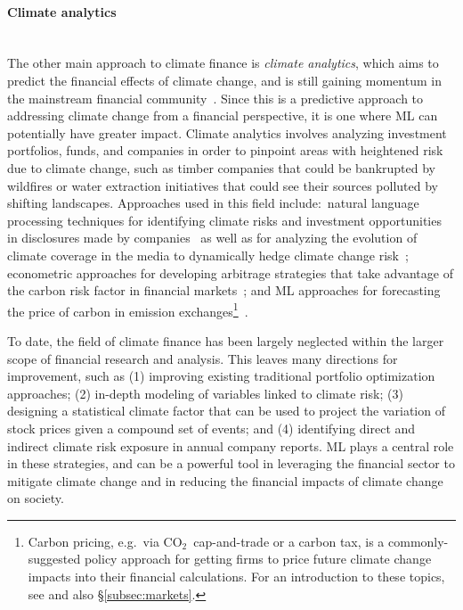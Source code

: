 \documentclass[11pt]{report}
\newcommand{\Gap}{\texorpdfstring{\hfill}{}}
\newcommand{\Rec}{\texorpdfstring{{\small\emph{\color{blue}{\fbox{High Leverage}}}}}{}}
\begin{document}
\paragraph*{Climate analytics}\Gap\Rec\label{sec:climate-analytics}\mbox{}\\
The other main approach to climate finance is \emph{climate analytics}, which aims to predict the financial effects of climate change, and is still gaining momentum in the mainstream financial community~\cite{eyraud2013}.
Since this is a predictive approach to addressing climate change from a financial perspective, it is one where ML can potentially have greater impact. 
Climate analytics involves analyzing investment portfolios, funds, and companies in order to pinpoint areas with heightened risk due to climate change, such as timber companies that could be bankrupted by wildfires or water extraction initiatives that could see their sources polluted by shifting landscapes. Approaches used in this field include:~natural language processing techniques for identifying climate risks and investment opportunities in disclosures made by companies~\cite{stanny2008} as well as for analyzing the evolution of climate coverage in the media to dynamically hedge climate change risk~\cite{engle2019}; econometric approaches for developing arbitrage strategies that take advantage of the carbon risk factor in financial markets~\cite{andersson2016}; and ML approaches for forecasting the price of carbon in emission exchanges\footnote{Carbon pricing, e.g.~via CO$_2$~cap-and-trade or a carbon tax, is a commonly-suggested policy approach for getting firms to price future climate change impacts into their financial calculations. For an introduction to these topics, see \cite{pizer2006choosing} and also \S\ref{subsec:markets}.}~\cite{zhu2017, zhou2018}. 

To date, the field of climate finance has been largely neglected within the larger scope of financial research and analysis. This leaves many directions for improvement, such as (1) improving existing traditional portfolio optimization approaches; (2) in-depth modeling of variables linked to climate risk; (3) designing a statistical climate factor that can be used to project the variation of stock prices given a compound set of events; and (4) identifying direct and indirect climate risk exposure in annual company reports. ML plays a central role in these strategies, and can be a powerful tool in leveraging the financial sector to mitigate climate change and in reducing the financial impacts of climate change on society.
\end{document}
